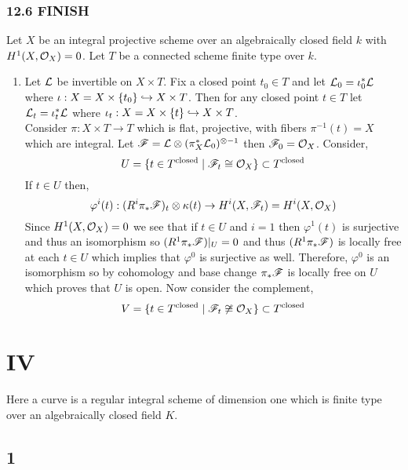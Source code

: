 \documentclass[12pt]{article}
\begin{document}
\subsubsection{12.6 FINISH}

Let $X$ be an integral projective scheme over an algebraically closed field $k$ with $H^1(X, \mathcal{O}_{X}) = 0$. Let $T$ be a connected scheme finite type over $k$.

\begin{enumerate}
\item Let $\mathcal{L}$ be invertible on $X \times T$. Fix a closed point $t_0 \in T$ and let $\mathcal{L}_0 = \iota_0^* \mathcal{L}$ where $\iota : X = X \times \{t_0\} \hookrightarrow X \times T$. Then for any closed point $t \in T$ let $\mathcal{L}_t = \iota^*_t \mathcal{L}$ where $\iota_t : X = X \times \{ t \} \hookrightarrow X \times T$.
\bigskip\\
Consider $\pi : X \times T \to T$ which is flat, projective, with fibers $\pi^{-1}(t) = X$ which are integral. Let $\mathscr{F} = \mathcal{L} \otimes (\pi_X^* \mathcal{L}_0)^{\otimes -1}$ then $\mathscr{F}_0 = \mathcal{O}_{X}$. Consider,
\[ U = \{ t \in T^{\text{closed}} \mid \mathscr{F}_t \cong \mathcal{O}_{X} \} \subset T^{\text{closed}} \]
If $t \in U$ then,
\[ \varphi^i(t) : (R^i \pi_* \mathscr{F})_t \otimes \kappa(t) \to H^i(X, \mathscr{F}_t) = H^i(X, \mathcal{O}_{X})  \]
Since $H^1(X, \mathcal{O}_{X}) = 0$ we see that if $t \in U$ and $i = 1$ then $\varphi^1(t)$ is surjective and thus an isomorphism so $(R^1 \pi_* \mathscr{F})|_U = 0$ and thus $(R^1 \pi_* \mathscr{F})$ is locally free at each $t \in U$ which implies that $\varphi^0$ is surjective as well. Therefore, $\varphi^0$ is an isomorphism so by cohomology and base change $\pi_* \mathscr{F}$ is locally free on $U$ which proves that $U$ is open. Now consider the complement,
\[ V = \{ t \in T^{\text{closed}} \mid \mathscr{F}_t \not\cong \mathcal{O}_{X} \} \subset T^{\text{closed}} \]
\end{enumerate}

\section{IV}

\begin{definition}
Here a curve is a regular integral scheme of dimension one which is finite type over an algebraically closed field $K$.
\end{definition}

\subsection{1}
\end{document}
